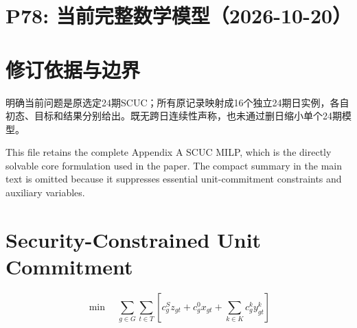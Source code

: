 \documentclass[11pt]{ctexart}
\begin{document}
\section*{P78: 当前完整数学模型（2026-10-20）}
\section*{修订依据与边界}明确当前问题是原选定24期SCUC；所有原记录映射成16个独立24期日实例，各自初态、目标和结果分别给出。既无跨日连续性声称，也未通过删日缩小单个24期模型。




This file retains the complete Appendix A SCUC MILP, which is the directly solvable core formulation used in the paper. The compact summary in the main text is omitted because it suppresses essential unit-commitment constraints and auxiliary variables.

\section{Security-Constrained Unit Commitment}

\begin{equation}
\min \quad \sum_{g\in G} \sum_{t\in T} \left[c_g^S z_{gt} + c_g^0 x_{gt} + \sum_{k\in K} c_g^k y_{gt}^k\right]
\tag{11}
\end{equation}
\end{document}
